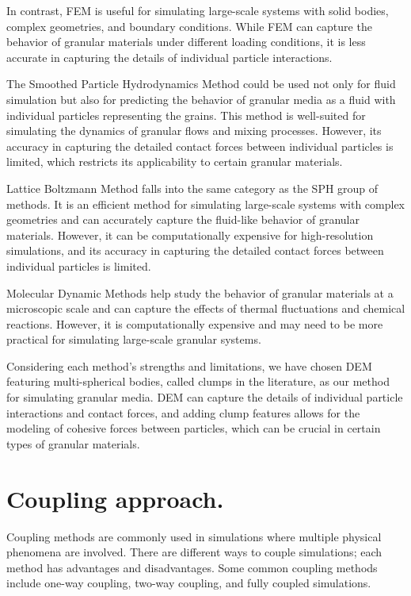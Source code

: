 In contrast, FEM is useful for simulating large-scale systems with solid bodies, complex geometries, and boundary conditions. While FEM can capture the behavior of granular materials under different loading conditions, it is less accurate in capturing the details of individual particle interactions.

The Smoothed Particle Hydrodynamics Method could be used not only for fluid simulation but also for predicting the behavior of granular media as a fluid with individual particles representing the grains. This method is well-suited for simulating the dynamics of granular flows and mixing processes. However, its accuracy in capturing the detailed contact forces between individual particles is limited, which restricts its applicability to certain granular materials.

Lattice Boltzmann Method falls into the same category as the SPH group of methods. It is an efficient method for simulating large-scale systems with complex geometries and can accurately capture the fluid-like behavior of granular materials. However, it can be computationally expensive for high-resolution simulations, and its accuracy in capturing the detailed contact forces between individual particles is limited.

Molecular Dynamic Methods help study the behavior of granular materials at a microscopic scale and can capture the effects of thermal fluctuations and chemical reactions. However, it is computationally expensive and may need to be more practical for simulating large-scale granular systems.

Considering each method's strengths and limitations, we have chosen DEM featuring multi-spherical bodies, called clumps in the literature, as our method for simulating granular media. DEM can capture the details of individual particle interactions and contact forces, and adding clump features allows for the modeling of cohesive forces between particles, which can be crucial in certain types of granular materials. 

\section{Coupling approach.}

Coupling methods are commonly used in simulations where multiple physical phenomena are involved. There are different ways to couple simulations; each method has advantages and disadvantages. Some common coupling methods include one-way coupling, two-way coupling, and fully coupled simulations.

